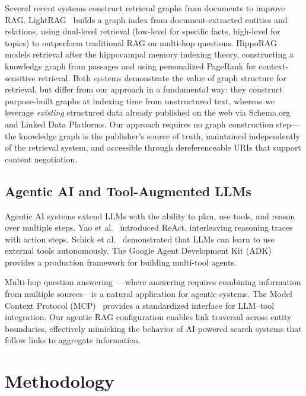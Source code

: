 \documentclass[runningheads]{llncs}
\begin{document}
Several recent systems construct retrieval graphs from documents to
improve RAG.  LightRAG~\cite{guo2024lightrag} builds a graph index
from document-extracted entities and relations, using dual-level
retrieval (low-level for specific facts, high-level for topics) to
outperform traditional RAG on multi-hop questions.
HippoRAG~\cite{gutierrez2024hipporag} models retrieval after the
hippocampal memory indexing theory, constructing a knowledge graph
from passages and using personalized PageRank for context-sensitive
retrieval.  Both systems demonstrate the value of graph structure
for retrieval, but differ from our approach in a fundamental way:
they construct purpose-built graphs at indexing time from unstructured
text, whereas we leverage \emph{existing} structured data already
published on the web via Schema.org and Linked Data Platforms.  Our
approach requires no graph construction step---the knowledge graph
is the publisher's source of truth, maintained independently of the
retrieval system, and accessible through dereferenceable URIs that
support content negotiation.

\subsection{Agentic AI and Tool-Augmented LLMs}

Agentic AI systems extend LLMs with the ability to plan, use tools,
and reason over multiple steps. Yao et al.~\cite{yao2023react}
introduced ReAct, interleaving reasoning traces with action steps.
Schick et al.~\cite{schick2023toolformer} demonstrated that LLMs
can learn to use external tools autonomously. The Google Agent
Development Kit (ADK)~\cite{googleadk2025} provides a production
framework for building multi-tool agents.

Multi-hop question answering~\cite{mavi2024multihop}---where
answering requires combining information from multiple
sources---is a natural application for agentic systems. The
Model Context Protocol (MCP)~\cite{mcp2024} provides a standardized
interface for LLM--tool integration. Our
agentic RAG configuration enables link traversal across entity
boundaries, effectively mimicking the behavior of AI-powered
search systems that follow links to aggregate information.

\section{Methodology}
\label{sec:method}
\end{document}
